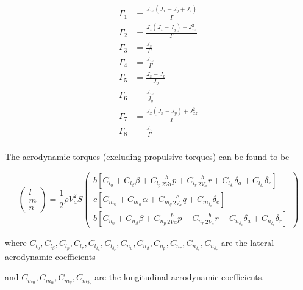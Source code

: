 \begin{equation}
\begin{split}
\Gamma_1&=\frac{J_{xz}(J_x-J_y+J_z)}{\Gamma}\\
\Gamma_2&=\frac{J_z(J_z-J_y)+J_{xz}^2}{\Gamma}\\
\Gamma_3&=\frac{J_z}{\Gamma}\\
\Gamma_4&=\frac{J_{xz}}{\Gamma}\\
\Gamma_5&=\frac{J_z-J_x}{J_y}\\
\Gamma_6&=\frac{J_{xz}}{J_y}\\
\Gamma_7&=\frac{J_x(J_x-J_y)+J_{xz}^2}{\Gamma}\\
\Gamma_8&=\frac{J_x}{\Gamma}\\
\end{split}
\end{equation}

The aerodynamic torques (excluding propulsive torques) can be found to be

\begin{equation}\label{eq:aero_torques}
\begin{pmatrix}
  l\\
  m\\
  n
 \end{pmatrix}
 =
 \frac{1}{2}\rho V_a^2S
 \begin{pmatrix}
  b\left[C_{l_0}+C_{l_\beta}\beta+C_{l_p}\frac{b}{2Va}p+C_{l_r}\frac{b}{2V_a}r+C_{l_{\delta_a}}\delta_a+C_{l_{\delta_r}}\delta_r\right]\\
  c\left[C_{m_0}+C_{m_\alpha}\alpha+C_{m_q}\frac{c}{2V_a}q+C_{m_{\delta_e}}\delta_e\right]\\
  b\left[C_{n_0}+C_{n_\beta}\beta+C_{n_p}\frac{b}{2Va}p+C_{n_r}\frac{b}{2V_a}r+C_{n_{\delta_a}}\delta_a+C_{n_{\delta_r}}\delta_r\right]
 \end{pmatrix}
\end{equation}

where $C_{l_0}, C_{l_\beta}, C_{l_p}, C_{l_r}, C_{l_{\delta_a}}, C_{l_{\delta_r}}, C_{n_0}, C_{n_\beta}, C_{n_p}, C_{n_r}, C_{n_{\delta_a}}, C_{n_{\delta_r}}$ are the lateral aerodynamic coefficients

and $C_{m_0}, C_{m_\alpha}, C_{m_q}, C_{m_{\delta_e}}$ are the longitudinal aerodynamic coefficients.

